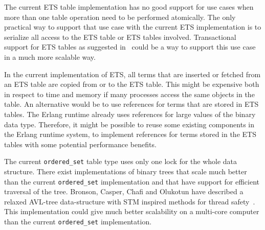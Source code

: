 \documentclass[aps,pre,preprint,nofootinbib]{revtex4}
\begin{document}
  The current ETS table implementation has no good support for use cases when more than one table operation need to be performed atomically.
  The only practical way to support that use case with the current ETS implementation is to serialize all access to the ETS table or ETS tables involved.
  Transactional support for ETS tables as suggested in~\cite{PatrikErlangTrans} could be a way to support this use case in a much more scalable way.
  
  In the current implementation of ETS, all terms that are inserted or fetched from an ETS table are copied from or to the ETS table.
  This might be expensive both in respect to time and memory if many processes access the same objects in the table.
  An alternative would be to use references for terms that are stored in ETS tables. 
  The Erlang runtime already uses references for large values of the binary data type.
  Therefore, it might be possible to reuse some existing components in the Erlang runtime system, to implement references for terms stored in the ETS tables with some potential performance benefits.
  
  The current \verb|ordered_set| table type uses only one lock for the whole data structure. 
  There exist implementations of binary trees that scale much better than the current \verb|ordered_set| implementation and that have support for efficient traversal of the tree.
  Bronson, Casper, Chafi and Olukotun have described a relaxed AVL-tree data-structure with STM inspired methods for thread safety~\cite{BronsonPracTree}.
  This implementation could give much better scalability on a multi-core computer than the current \verb|ordered_set| implementation.
  

  


  
\end{document}
